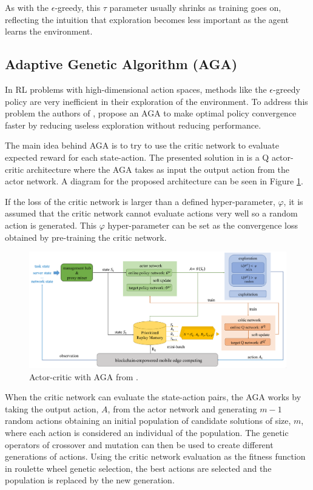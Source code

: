 As with the $\epsilon$-greedy, this $\tau$ parameter usually shrinks as training goes on, reflecting the intuition that exploration becomes less important as the agent learns the environment.

\subsection{Adaptive Genetic Algorithm (AGA)} \label{AGA}
\noindent In \acrshort{RL} problems with high-dimensional action spaces, methods like the $\epsilon$-greedy policy are very inefficient in their exploration of the environment. To address this problem the authors of \cite{AGAcrypto}, propose an \acrfull{AGA} to make optimal policy convergence faster by reducing useless exploration without reducing performance.

The main idea behind \acrshort{AGA} is to try to use the critic network to evaluate expected reward for each state-action. The presented solution in \cite{AGAcrypto} is a Q actor-critic architecture where the \acrshort{AGA} takes as input the output action from the actor network. A diagram for the proposed architecture can be seen in Figure \ref{AGAcryptoImag}.

If the loss of the critic network is larger than a defined hyper-parameter, $\varphi$, it is assumed that the critic network cannot evaluate actions very well so a random action is generated. This $\varphi$ hyper-parameter can be set as the convergence loss obtained by pre-training the critic network.

\begin{figure}[h]
  \centering
  \includegraphics[width=\textwidth]{images/AGA.png}
  \caption{Actor-critic with AGA from \cite{AGAcrypto}.} \label{AGAcryptoImag}
\end{figure}

When the critic network can evaluate the state-action pairs, the \acrshort{AGA} works by taking the output action, $A$, from the actor network and generating $m-1$ random actions obtaining an initial population of candidate solutions of size, $m$, where each action is considered an individual of the population. The genetic operators of crossover and mutation can then be used to create different generations of actions. Using the critic network evaluation as the fitness function in roulette wheel genetic selection, the best actions are selected and the population is replaced by the new generation.

